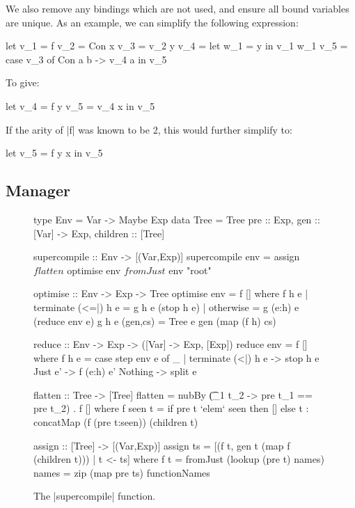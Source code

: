 \documentclass[draft]{sigplanconf}
\begin{document}
We also remove any bindings which are not used, and ensure all bound variables are unique. As an example, we can simplify the following expression:

\begin{code}
let  v_1  = f
     v_2  = Con x
     v_3  = v_2 y
     v_4  = let w_1 = y in v_1 w_1
     v_5  = case v_3 of Con a b -> v_4 a
in   v_5
\end{code}

\noindent To give:

\begin{code}
let  v_4  = f y
     v_5  = v_4 x
in   v_5
\end{code}

\noindent If the arity of |f| was known to be 2, this would further simplify to:

\begin{code}
let  v_5  = f y x
in   v_5
\end{code}

\subsection{Manager}
\label{sec:manager}

\begin{figure}
\begin{code}
type Env = Var -> Maybe Exp
data Tree = Tree
    {pre :: Exp, gen :: [Var] -> Exp, children :: [Tree]}

supercompile :: Env -> [(Var,Exp)]
supercompile env =
    assign $ flatten $ optimise env $ fromJust $ env "root"

optimise :: Env -> Exp -> Tree
optimise env = f []
    where  f h e  | terminate (<=|) h e = g h e (stop h e)
                  | otherwise = g (e:h) e (reduce env e)
           g h e (gen,cs) = Tree e gen (map (f h) cs)

reduce :: Env -> Exp -> ([Var] -> Exp, [Exp])
reduce env = f []
    where f h e = case  step env e of
                        _ | terminate (<|) h e -> stop h e
                        Just e'  -> f (e:h) e'
                        Nothing  -> split e

flatten :: Tree -> [Tree]
flatten = nubBy (\t_1 t_2 -> pre t_1 == pre t_2) . f []
    where f seen t  =  if pre t `elem` seen then [] else
                       t : concatMap (f (pre t:seen)) (children t)

assign :: [Tree] -> [(Var,Exp)]
assign ts = [(f t, gen t (map f (children t))) |  t <- ts]
    where  f t = fromJust (lookup (pre t) names)
           names = zip (map pre ts) functionNames
\end{code}
\caption{The |supercompile| function.}
\label{fig:manager}
\end{figure}
\end{document}
